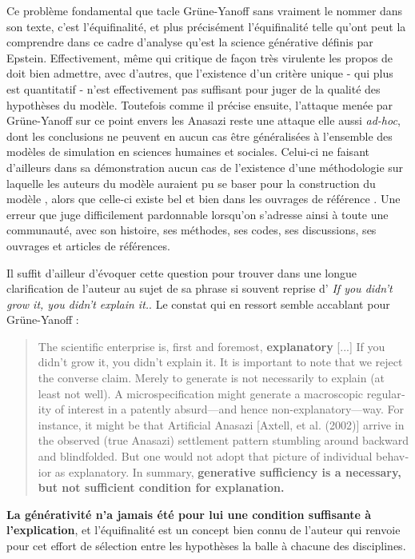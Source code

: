 Ce problème fondamental que tacle Grüne-Yanoff sans vraiment le nommer dans son texte, c'est l'équifinalité, et plus précisément l'équifinalité telle qu'ont peut la comprendre dans ce cadre d'analyse qu'est la science générative définis par Epstein. Effectivement, même \textcite{Chattoe2011} qui critique de façon très virulente les propos de \textcite{Yanoff2008} doit bien admettre, avec d'autres, que l'existence d'un critère unique - qui plus est quantitatif - n'est effectivement pas suffisant pour juger de la qualité des hypothèses du modèle. Toutefois comme il précise ensuite, l'attaque menée par Grüne-Yanoff sur ce point envers les Anasazi reste une attaque elle aussi \textit{ad-hoc}, dont les conclusions ne peuvent en aucun cas être généralisées à l'ensemble des modèles de simulation en sciences humaines et sociales. Celui-ci ne faisant d'ailleurs dans sa démonstration aucun cas de l'existence d'une méthodologie sur laquelle les auteurs du modèle auraient pu se baser pour la construction du modèle , alors que celle-ci existe bel et bien dans les ouvrages de référence \autocites{Gilbert1995a, Gilbert2005}. Une erreur que \textcite{Chattoe2011} juge difficilement pardonnable lorsqu'on s'adresse ainsi à toute une communauté, avec son histoire, ses méthodes, ses codes, ses discussions, ses ouvrages et articles de références. 

Il suffit d'ailleur d'évoquer cette question pour trouver dans \textcite{Epstein2006} une longue clarification de l'auteur au sujet de sa phrase si souvent reprise d'\textcite{Epstein1999} \textit{If you didn’t grow it, you didn’t explain it.}. Le constat qui en ressort semble accablant pour Grüne-Yanoff : 

\foreignblockquote{english}[\cite{Epstein2006}]{The scientific enterprise is, first and foremost, \textbf{explanatory} [...] If you didn’t grow it, you didn’t explain it. It is important to note that we reject the converse claim. Merely to generate is not necessarily to explain (at least not well). A microspecification might generate a macroscopic regularity of interest in a patently absurd—and hence non-explanatory—way. For instance, it might be that Artificial Anasazi [Axtell, et al. (2002)] arrive in the observed (true Anasazi) settlement pattern stumbling around backward and blindfolded. But one would not adopt that picture of individual behavior as explanatory. In summary, \textbf{generative sufficiency is a necessary, but not sufficient condition for explanation.}} 

\textbf{La générativité n'a jamais été pour lui une condition suffisante à l'explication}, et l'équifinalité est un concept bien connu de l'auteur qui renvoie pour cet effort de sélection entre les hypothèses la balle à chacune des disciplines. 

